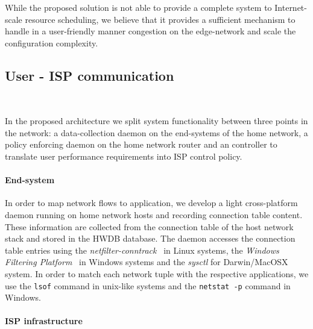 
While the proposed solution is not able to provide a complete system to
Internet-scale resource scheduling, we believe that it provides a sufficient
mechanism to handle in a user-friendly manner congestion on the edge-network and
scale the configuration complexity. 


\subsection{User - ISP communication} ~\label{s:qos:architecture}

In the proposed architecture we split system functionality between three
points in the network: a data-collection daemon on the end-systems of the home
network, a policy enforcing daemon on the home network router and an
\of controller to translate user performance requirements into ISP control
policy.

\paragraph*{End-system}

In order to map network flows to application, we develop a light cross-platform
daemon running on home network hosts and recording connection table content.
These information are collected from the connection table of the host network
stack and stored in the HWDB database. The daemon accesses the connection table
entries using the {\it netfilter-conntrack}~\cite{netfilter} in Linux systems,
the {\it Windows Filtering Platform}~\cite{win-wfp} in Windows systems and the
{\it sysctl} \/for Darwin/MacOSX system. 
In order to match each network tuple
with the respective applications, we use the {\tt lsof} command in unix-like
systems and the {\tt netstat -p} command in Windows.

\paragraph*{ISP infrastructure}

